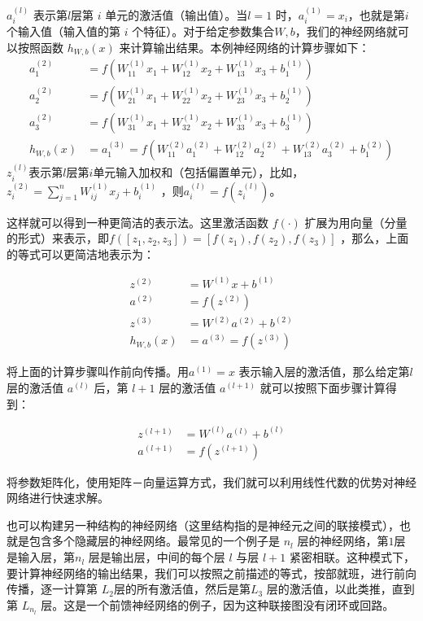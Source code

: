 $ a^{(l)}_i$ 表示第$  l $层第 $ i$ 单元的激活值（输出值）。当$  l=1$ 时，$  a^{(1)}_i = x_i $，也就是第$  i $个输入值（输入值的第 $ i$ 个特征）。对于给定参数集合$  W,b $，我们的神经网络就可以按照函数 $ h_{W,b}(x)$ 来计算输出结果。本例神经网络的计算步骤如下：
\begin{align}
a_1^{(2)} &= f(W_{11}^{(1)}x_1 + W_{12}^{(1)} x_2 + W_{13}^{(1)} x_3 + b_1^{(1)})  \\
a_2^{(2)} &= f(W_{21}^{(1)}x_1 + W_{22}^{(1)} x_2 + W_{23}^{(1)} x_3 + b_2^{(1)})  \\
a_3^{(2)} &= f(W_{31}^{(1)}x_1 + W_{32}^{(1)} x_2 + W_{33}^{(1)} x_3 + b_3^{(1)})  \\
h_{W,b}(x) &= a_1^{(3)} =  f(W_{11}^{(2)}a_1^{(2)} + W_{12}^{(2)} a_2^{(2)} + W_{13}^{(2)} a_3^{(2)} + b_1^{(2)}) 
\end{align}
 $ z^{(l)}_i $表示第$ l $层第$  i$单元输入加权和（包括偏置单元），比如，$  z_i^{(2)} = \sum_{j=1}^n W^{(1)}_{ij} x_j + b^{(1)}_i$ ，则$  a^{(l)}_i = f(z^{(l)}_i) $。

这样就可以得到一种更简洁的表示法。这里激活函数 $ f(\cdot)$ 扩展为用向量（分量的形式）来表示，即$  f([z_1, z_2, z_3]) = [f(z_1), f(z_2), f(z_3)]$ ，那么，上面的等式可以更简洁地表示为：

\begin{align}
z^{(2)} &= W^{(1)} x + b^{(1)} \\
a^{(2)} &= f(z^{(2)}) \\
z^{(3)} &= W^{(2)} a^{(2)} + b^{(2)} \\
h_{W,b}(x) &= a^{(3)} = f(z^{(3)})
\end{align}

将上面的计算步骤叫作前向传播。用$  a^{(1)} = x$ 表示输入层的激活值，那么给定第$  l$ 层的激活值 $ a^{(l)}$ 后，第 $ l+1$ 层的激活值 $ a^{(l+1)}$ 就可以按照下面步骤计算得到：

 \begin{align}
z^{(l+1)} &= W^{(l)} a^{(l)} + b^{(l)}   \\
a^{(l+1)} &= f(z^{(l+1)})
\end{align}

将参数矩阵化，使用矩阵－向量运算方式，我们就可以利用线性代数的优势对神经网络进行快速求解。

也可以构建另一种结构的神经网络（这里结构指的是神经元之间的联接模式），也就是包含多个隐藏层的神经网络。最常见的一个例子是 $  n_l$ 层的神经网络，第$   1 $层是输入层，第$   n_l$ 层是输出层，中间的每个层 $  l$ 与层 $  l+1$ 紧密相联。这种模式下，要计算神经网络的输出结果，我们可以按照之前描述的等式，按部就班，进行前向传播，逐一计算第 $  L_2 $层的所有激活值，然后是第$  L_3$ 层的激活值，以此类推，直到第 $  L_{n_l}$ 层。这是一个前馈神经网络的例子，因为这种联接图没有闭环或回路。

